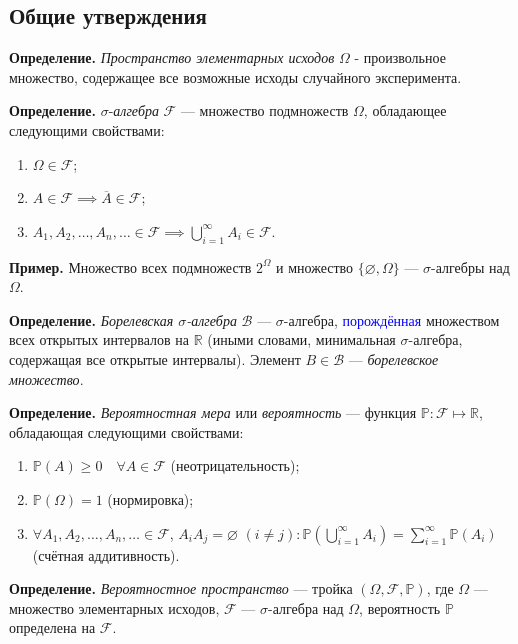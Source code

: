 \subsection{Общие утверждения}

\textbf{Определение.} \textit{Пространство элементарных исходов} $\Omega$ - произвольное множество, содержащее все возможные исходы случайного эксперимента.

\textbf{Определение.} $\sigma$-\textit{алгебра} $\mathcal{F}$ — множество подмножеств $\Omega$, обладающее следующими свойствами:
\begin{enumerate}
    \item $\Omega \in \mathcal{F}$;
    \item $A \in \mathcal{F} \implies \overline{A} \in \mathcal{F}$;
    \item $A_1, A_2, \ldots, A_n, \ldots \in \mathcal{F} \implies \bigcup_{i=1}^\infty A_i \in \mathcal{F}$.
\end{enumerate}

\textbf{Пример.} Множество всех подмножеств $2^{\Omega}$ и множество $\{\varnothing, \Omega\}$ — $\sigma$-алгебры над $\Omega$.

\textbf{Определение.} \textit{Борелевская $\sigma$-алгебра} $\mathcal{B}$ — $\sigma$-алгебра, \textcolor{blue}{порождённая} множеством всех открытых интервалов на $\mathbb{R}$ (иными словами, минимальная $\sigma$-алгебра, содержащая все открытые интервалы). Элемент $B \in \mathcal{B}$ — \textit{борелевское множество}.


\textbf{Определение.} \textit{Вероятностная мера} или \textit{вероятность} — функция $\mathbb{P}:\mathcal{F} \mapsto \mathbb{R}$, обладающая следующими свойствами:
\begin{enumerate}
    \item $\mathbb{P}(A) \geq 0 \quad \forall A \in \mathcal{F}$ \; (неотрицательность);
    \item $\mathbb{P}(\Omega) = 1$ \; (нормировка);
    \item $\forall A_1, A_2, \ldots, A_n, \ldots \in \mathcal{F}$, $A_i A_j = \varnothing$ $(i \neq j): \mathbb{P}\left(\bigcup_{i=1}^{\infty} A_i\right) = \sum_{i=1}^{\infty} \mathbb{P}(A_i)$ \; (счётная аддитивность).
\end{enumerate}

\textbf{Определение.} \textit{Вероятностное пространство} — тройка $(\Omega, \mathcal{F}, \mathbb{P})$, где $\Omega$ — множество элементарных исходов, $\mathcal{F}$ — $\sigma$-алгебра над $\Omega$, вероятность $\mathbb{P}$ определена на $\mathcal{F}$.

